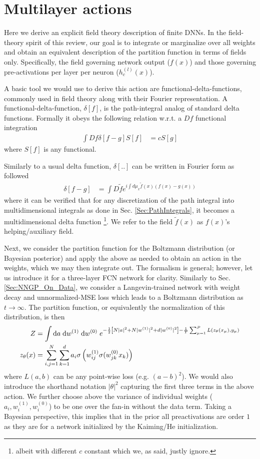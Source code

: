 \section{Multilayer actions}
Here we derive an explicit field theory description of finite DNNs. In the field-theory spirit of this review, our goal is to integrate or marginalize over all weights and obtain an equivalent description of the partition function in terms of fields only. Specifically, the field governing network output ($f(x)$) and those governing pre-activations per layer per neuron ($h^{(l)}_c(x)$). 

A basic tool we would use to derive this action are functional-delta-functions, commonly used in field theory \citep{MoritzBook} along with their Fourier representation. A functional-delta-function, $\delta[f]$, is the path-integral analog of standard delta functions. Formally it obeys the following relation w.r.t. a $Df$ functional integration  
\begin{align}
\int Df \delta[f-g] S[f] &= cS[g] 
\end{align}
where $S[f]$ is any functional. 

Similarly to a usual delta function, $\delta[..]$ can be written in Fourier form as followed
\begin{align}
\delta[f-g] &= \int D\tilde{f} e^{i \int d\mu_x \tilde{f}(x)(f(x)-g(x))}
\end{align}
where it can be verified that for any discretization of the path integral into multidimensional integrals as done in Sec. \ref{Sec:PathIntegrals}, it becomes a multidimensional delta function \footnote{albeit with different $c$ constant which we, as said, justly ignore.}. We refer to the field $\tilde{f}(x)$ as $f(x)$'s helping/auxiliary field.  

Next, we consider the partition function for the Boltzmann distribution (or Bayesian posterior) and apply the above as needed to obtain an action in the weights, which we may then integrate out. The formalism is general; however, let us introduce it for a three-layer FCN network for clarity. Similarly to Sec. \ref{Sec:NNGP_On_Data}, we consider a Langevin-trained network with weight decay and unnormalized-MSE loss which leads to a Boltzmann distribution as $t \rightarrow \infty$. The partition function, or equivalently the normalization of this distribution, is then     
\begin{align}
Z &= \int \text{d} {a} \;\text{d}{w^{(1)}} \;\text{d}{w^{(0)}} \; e^{-\frac{1}{2}\left[N|{a}|^2+N|{w^{(1)}}|^2+d |{w^{(0)}}|^2\right]- \frac{1}{T}\sum_{\mu=1}^P L(z_{{\theta}}(x_{\mu}),y_{\mu})}\\ \nonumber 
z_{\theta}(x) &= \sum_{i,j=1}^N \sum_{k=1}^d a_i \sigma\left(w^{(1)}_{ij} \sigma(w^{(0)}_{jk} x_k)\right)
\end{align}
 where $L(a,b)$ can be any point-wise loss (e.g. $(a-b)^2$). We would also introduce the shorthand notation $|{\theta}|^2$ capturing the first three terms in the above action. We further choose above the variance of individual weights ($a_i,w^{(1)}_i,w^{(0)}_i$) to be one over the fan-in without the data term. Taking a Bayesian perspective, this implies that in the prior all preactivations are order $1$ as they are for a network initialized by the  Kaiming/He initialization.

